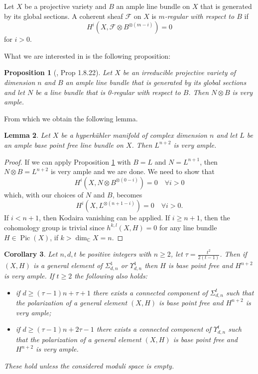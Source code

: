 \documentclass{article}
\DeclareMathOperator{\Pic}{Pic}
\newtheorem{proposition}{Proposition}[section]
\newtheorem{lemma}[proposition]{Lemma}
\newtheorem{corollary}[proposition]{Corollary}
\begin{document}
Let $X$ be a projective variety and $B$ an ample line bundle on $X$ that is generated by its global sections. A coherent sheaf $\mathcal{F}$ on $X$ is \emph{$m$-regular with respect to $B$} if $$H^i(X,\mathcal{F}\otimes B^{\otimes(m-i)})=0$$ for $i>0$.

What we are interested in is the following proposition:
\begin{proposition}[\cite{Lazarsfeld2004PositivityI}, Prop 1.8.22]\label{prop_0_regular_gives_very_ample}
Let $X$ be an irreducible projective variety of dimension $n$ and $B$ an ample line bundle that is generated by its global sections and let $N$ be a line bundle that is 0-regular with respect to $B$. Then $N\otimes B$ is very ample.
\end{proposition} 

From which we obtain the following lemma.

\begin{lemma}
    Let $X$ be a hyperk\"ahler manifold of complex dimension $n$ and let $L$ be an ample base point free line bundle on $X$. Then $L^{n+2}$ is very ample.
\end{lemma}

\begin{proof}
    If we can apply Proposition \ref{prop_0_regular_gives_very_ample} with $B=L$ and $N=L^{n+1}$, then $N\otimes B=L^{n+2}$ is very ample and we are done. We need to show that $$H^i(X,N\otimes B^{\otimes(0-i)})=0\quad \forall i>0$$
    which, with our choices of $N$ and $B$, becomes $$H^i(X,L^{\otimes(n+1-i)})=0\quad \forall i>0.$$
    If $i<n+1$, then Kodaira vanishing can be applied.
    If $i\geq n+1$, then the cohomology group is trivial since $h^{k,l}(X,H)=0$ for any line bundle $H\in \Pic(X)$, if $k>\dim_{\mathbb{C}} X=n$.
\end{proof}

\begin{corollary}
     Let $n,d,t$ be positive integers with $n\geq 2$, let $\tau =\frac{t^2}{2(t-1)}$. Then if $(X,H)$ is a general element of $\Sigma_{d,n}^1$ or $\Upsilon_{d,n}^1$ then $H$ is base point free and $H^{n+2}$ is very ample. If $t\geq 2$ the following also holds:
    \begin{itemize}
        \item if $d\geq (\tau-1)n+\tau+1$ there exists a connected component of $\Sigma_{d,n}^t$ such that the polarization of a general element $(X,H)$ is base point free and $H^{n+2}$ is very ample;
        \item if $d\geq (\tau-1)n+2\tau-1$ there exists a connected component of $\Upsilon_{d,n}^t$ such that the polarization of a general element $(X,H)$ is base point free and $H^{n+2}$ is very ample.
    \end{itemize}
These hold unless the considered moduli space is empty.
\end{corollary}
\end{document}
